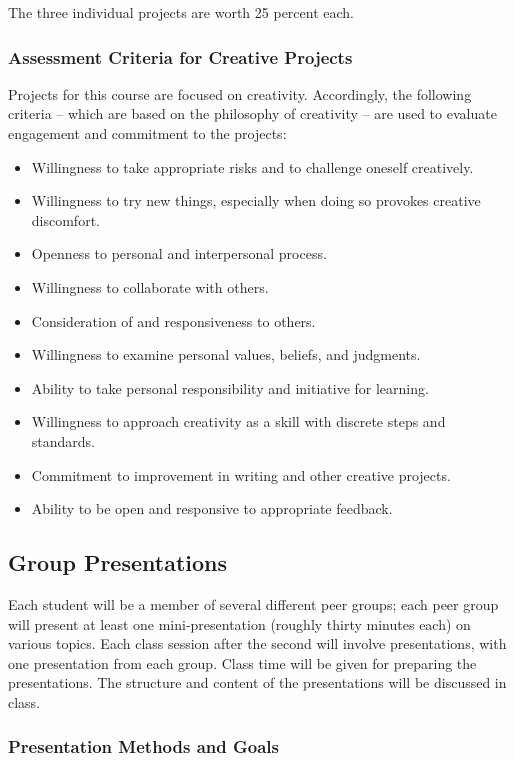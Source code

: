 \documentclass[letterpaper,10pt,headsepline]{scrreprt}
\begin{document}
The three individual projects are worth 25 percent each.

\subsubsection{Assessment Criteria for Creative Projects}

Projects for this course are focused on creativity. Accordingly, the following criteria -- which are based on the philosophy of creativity  --  are used to evaluate engagement and commitment to the projects:

\begin{itemize}
\item Willingness to take appropriate risks and to challenge oneself creatively.
\item Willingness to try new things, especially when doing so provokes creative discomfort.
\item Openness to personal and interpersonal process.
\item Willingness to collaborate with others.
\item Consideration of and responsiveness to others.
\item Willingness to examine personal values, beliefs, and judgments.
\item Ability to take personal responsibility and initiative for learning.
\item Willingness to approach creativity as a skill with discrete steps and standards.
\item Commitment to improvement in writing and other creative projects.
\item Ability to be open and responsive to appropriate feedback.
\end{itemize}


\subsection{Group Presentations}

Each student will be a member of several different peer groups; each
peer group will present at least one mini-presentation (roughly thirty minutes each) on various topics. Each class session after the second will involve presentations, with one presentation from each group. Class time will be given for preparing the presentations. The structure and content of the presentations will be discussed in class.

\subsubsection{Presentation Methods and Goals}
\end{document}

